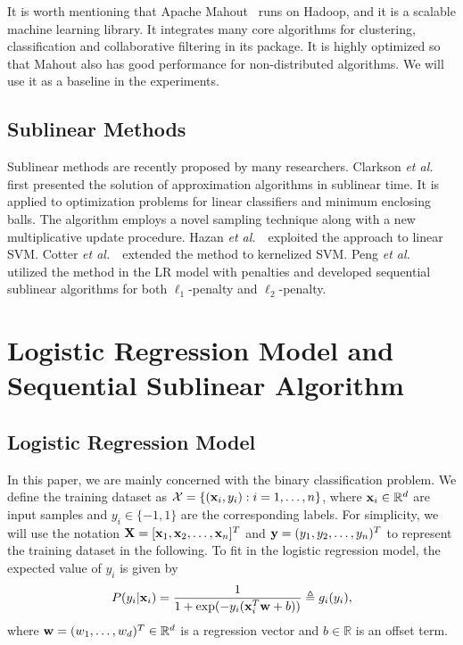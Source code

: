 \documentclass[10pt, conference, compsocconf]{IEEEtran}
\def\X{{\bf X}}
\def\x{{\bf x}}
\def\y{{\bf y}}
\def\w{{\bf w}}
\def\XM{{\mathcal X}}
\def\RB{{\mathbb R}}
\def\etal{{\em et al.\/}\,}
\begin{document}
It is worth mentioning that Apache Mahout~\cite{mahoutscalable} runs on Hadoop, and it is a scalable machine learning library. It integrates many core algorithms for clustering, classification and collaborative filtering in its package. It is highly optimized so that Mahout also has good performance for non-distributed algorithms. We will use it as a baseline in the experiments.

\subsection{Sublinear Methods}
Sublinear methods are recently proposed by many researchers.
Clarkson \etal~\cite{clarkson2010sublinear} first presented the solution of approximation algorithms in sublinear time.
It is applied to optimization problems for linear classifiers and minimum enclosing balls.
The algorithm employs a novel sampling technique along with a new multiplicative update procedure.
Hazan \etal~\cite{hazanbeating} exploited the approach to linear SVM.
Cotter \etal~\cite{cotter2012kernelized} extended the method to kernelized SVM.
Peng \etal~\cite{peng2012sublinear} utilized the method in the LR model with penalties and developed sequential sublinear algorithms for both $\ell_1$-penalty and $\ell_2$-penalty.

\section{Logistic Regression Model and Sequential Sublinear Algorithm} \label{sec:plr}

\subsection{Logistic Regression Model} \label{sec:def}
In this paper, we are mainly concerned with the binary classification problem.  	
We define the training dataset as $\XM=\{(\x_i, y_i): i=1, \ldots, n\}$, where $\x_i \in \RB^d$ are input samples and $y_i \in \{-1, 1\}$ are the corresponding labels.
For simplicity, we will use the notation $\X=[{\x}_{1}, {\x}_{2}, \ldots, {\x}_n]^{T}$ and $\y=(y_1, y_2, \ldots, y_n)^T$ to represent the training dataset in the following.
To fit in the logistic regression model, the expected value of $y_i$ is given by\vspace{-0.2cm}
\[
P(y_i|\x_i)= \frac{1}{1+ \exp(- y_i(\x_i^T \w + b))} \triangleq g_i(y_i),\vspace{-0.2cm}
\]
where $\w=(w_1, \ldots, w_d)^T \in \RB^d$ is a regression vector and $b\in \RB$ is an offset term.
\end{document}
